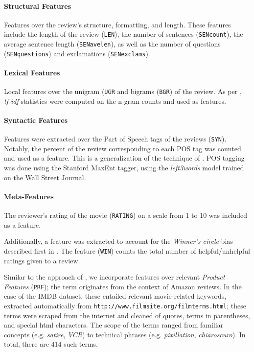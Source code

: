 \documentclass[letter,10pt]{article}
\begin{document}
\paragraph{Structural Features}
Features over the review's structure, formatting, and length. 
These features include the length of the review ({\tt LEN}), 
	the number of sentences ({\tt SENcount}),
	the average sentence length ({\tt SENavelen}),
	as well as the number of questions ({\tt SENquestions})
	and exclamations ({\tt SENexclams}).

\paragraph{Lexical Features}\label{lexical}
Local features over the unigram ({\tt UGR} and 
	bigrams ({\tt BGR}) of the review.
As per , {\em tf-idf} statistics were computed
 on the n-gram counts and used as features.

\paragraph{Syntactic Features}
Features were extracted over the Part of Speech tags of the reviews ({\tt SYN}).
Notably, the percent of the review corresponding to each POS tag was counted
	and used as a feature. 
This is a generalization of the technique of .
POS tagging was done using the Stanford MaxEnt tagger, using the
	{\em left3words} model trained on the Wall Street Journal.

\paragraph{Meta-Features}
The reviewer's rating of the movie ({\tt RATING}) on a scale from 1 to 10
	was included as a feature.

Additionally, a feature was extracted to account for the {\em Winner's circle}
	bias described first in .
The feature ({\tt WIN}) counts the total number of helpful/unhelpful
	ratings given to a review.


Similar to the approach of , we incorporate
	features over relevant {\em Product Features} ({\tt PRF}); 
	the term originates from the context of Amazon reviews.
In the case of the IMDB dataset, these entailed relevant movie-related keywords,
	extracted automatically from {\tt http://www.filmsite.org/filmterms.html};
these terms were scraped from the internet and cleaned of quotes,
	terms in parentheses, and special html characters.
The scope of the terms ranged from familiar concepts (e.g. {\em satire}, 
	{\em VCR}) to technical phrases (e.g. {\em pixillation}, {\em chiaroscuro}).
In total, there are 414 such terms.
\end{document}

